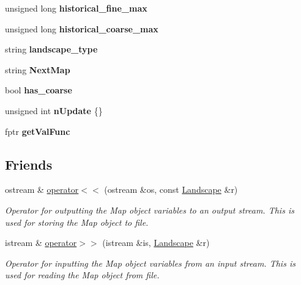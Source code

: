 \begin{DoxyCompactItemize}
\item 
unsigned long {\bfseries historical\+\_\+fine\+\_\+max}\hypertarget{class_landscape_a86e67628c5ad3426f1f258e35ab5e4df}{}\label{class_landscape_a86e67628c5ad3426f1f258e35ab5e4df}

\item 
unsigned long {\bfseries historical\+\_\+coarse\+\_\+max}\hypertarget{class_landscape_aa79ae2cca59b135591c3cb978f14ee2a}{}\label{class_landscape_aa79ae2cca59b135591c3cb978f14ee2a}

\item 
string {\bfseries landscape\+\_\+type}\hypertarget{class_landscape_a2bed03fc250afab4f9341da6f1f6c0da}{}\label{class_landscape_a2bed03fc250afab4f9341da6f1f6c0da}

\item 
string {\bfseries Next\+Map}\hypertarget{class_landscape_a7e16bed309816971071c17ad0ebf94e5}{}\label{class_landscape_a7e16bed309816971071c17ad0ebf94e5}

\item 
bool {\bfseries has\+\_\+coarse}\hypertarget{class_landscape_a0389b53426acd490ec77f94d9897f130}{}\label{class_landscape_a0389b53426acd490ec77f94d9897f130}

\item 
unsigned int {\bfseries n\+Update} \{\}\hypertarget{class_landscape_ae4830197a96ec263ee533b65aac8d2e6}{}\label{class_landscape_ae4830197a96ec263ee533b65aac8d2e6}

\item 
fptr {\bfseries get\+Val\+Func}\hypertarget{class_landscape_a3cca2f0650d5979668f2a22753f965b9}{}\label{class_landscape_a3cca2f0650d5979668f2a22753f965b9}

\end{DoxyCompactItemize}
\subsection*{Friends}
\begin{DoxyCompactItemize}
\item 
ostream \& \hyperlink{class_landscape_a1c309185f0c3a601f27c932f1f2fa886}{operator$<$$<$} (ostream \&os, const \hyperlink{class_landscape}{Landscape} \&r)
\begin{DoxyCompactList}\small\item\em Operator for outputting the Map object variables to an output stream. This is used for storing the Map object to file. \end{DoxyCompactList}\item 
istream \& \hyperlink{class_landscape_a8b9beb241ad534346dc98d24f6bb9279}{operator$>$$>$} (istream \&is, \hyperlink{class_landscape}{Landscape} \&r)
\begin{DoxyCompactList}\small\item\em Operator for inputting the Map object variables from an input stream. This is used for reading the Map object from file. \end{DoxyCompactList}\end{DoxyCompactItemize}


